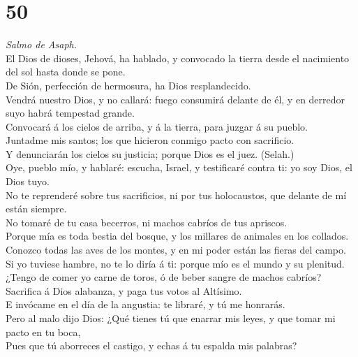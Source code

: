 \hypertarget{section-49}{%
\section{50}\label{section-49}}

 \emph{Salmo de Asaph.}\\
El Dios de dioses, Jehová, ha hablado, y convocado la tierra desde el
nacimiento del sol hasta donde se pone.\\
 De Sión, perfección de hermosura, ha Dios resplandecido.\\
 Vendrá nuestro Dios, y no callará: fuego consumirá delante
de él, y en derredor suyo habrá tempestad grande.\\
 Convocará á los cielos de arriba, y á la tierra, para
juzgar á su pueblo.\\
 Juntadme mis santos; los que hicieron conmigo pacto con
sacrificio.\\
 Y denunciarán los cielos su justicia; porque Dios es el
juez. (Selah.)\\
 Oye, pueblo mío, y hablaré: escucha, Israel, y testificaré
contra ti: yo soy Dios, el Dios tuyo.\\
 No te reprenderé sobre tus sacrificios, ni por tus
holocaustos, que delante de mí están siempre.\\
 No tomaré de tu casa becerros, ni machos cabríos de tus
apriscos.\\
 Porque mía es toda bestia del bosque, y los millares de
animales en los collados.\\
 Conozco todas las aves de los montes, y en mi poder están
las fieras del campo.\\
 Si yo tuviese hambre, no te lo diría á ti: porque mío es
el mundo y su plenitud.\\
 ¿Tengo de comer yo carne de toros, ó de beber sangre de
machos cabríos?\\
 Sacrifica á Dios alabanza, y paga tus votos al Altísimo.\\
 E invócame en el día de la angustia: te libraré, y tú me
honrarás.\\
 Pero al malo dijo Dios: ¿Qué tienes tú que enarrar mis
leyes, y que tomar mi pacto en tu boca,\\
 Pues que tú aborreces el castigo, y echas á tu espalda mis
palabras?\\
